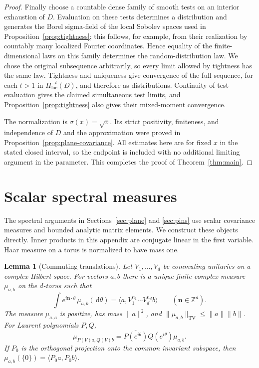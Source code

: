 \documentclass[11pt]{article}
\newtheorem{lemma}[theorem]{Lemma}
\theoremstyle{definition}
\theoremstyle{remark}
\numberwithin{equation}{section}
\begin{document}
\begin{proof}
Finally choose a countable dense family of smooth tests on an
interior exhaustion of \(D\).  Evaluation on these tests determines
a distribution and generates the Borel sigma-field of the local
Sobolev spaces used in Proposition~\ref{prop:tightness}; this follows,
for example, from their realization by countably many localized
Fourier coordinates.  Hence equality of the finite-dimensional
laws on this family determines the random-distribution law.
We chose the original subsequence arbitrarily, so every limit
allowed by tightness has the same law.  Tightness and uniqueness
give convergence of the full sequence, for each \(t>1\) in
\(H^{-t}_{\mathrm{loc}}(D)\), and therefore as distributions.
Continuity of test evaluation gives the claimed simultaneous
test limits, and Proposition~\ref{prop:tightness} also gives their
mixed-moment convergence.

The normalization is \(\sigma(x)=\sqrt v\).
Its strict positivity, finiteness, and independence of \(D\) and
the approximation were proved in
Proposition~\ref{prop:plane-covariance}.  All estimates here are
for fixed \(x\) in the stated closed interval, so the endpoint is
included with no additional limiting argument in the parameter.
This completes the proof of Theorem~\ref{thm:main}.
\end{proof}


\appendix
\section{Scalar spectral measures}\label{sec:scalar-spectra}

The spectral arguments in Sections~\ref{sec:plane} and \ref{sec:pins}
use scalar covariance measures and bounded analytic matrix elements.
We construct these objects directly.  Inner products in this appendix
are conjugate linear in the first variable.  Haar measure on a torus
is normalized to have mass one.

\begin{lemma}[Commuting translations]\label{spectra:unitary}
Let $V_1,\ldots,V_d$ be commuting unitaries on a complex Hilbert space.
For vectors $a,b$ there is a unique finite complex measure $\mu_{a,b}$
on the $d$-torus such that
\[
 \int e^{i\mathbf n\cdot\theta}\,\mu_{a,b}(\,\mathrm d\theta)
   =\langle a,V_1^{n_1}\cdots V_d^{n_d}b\rangle
 \qquad(\mathbf n\in\mathbb Z^d).
\]
The measure $\mu_{a,a}$ is positive, has mass $\|a\|^2$, and
$\|\mu_{a,b}\|_{\mathrm{TV}}\le\|a\|\|b\|$.  For Laurent polynomials $P,Q$,
\[
 \mu_{P(V)a,Q(V)b}
   =\overline{P(e^{i\theta})}Q(e^{i\theta})\mu_{a,b}.
\]
If $P_0$ is the orthogonal projection onto the common invariant
subspace, then $\mu_{a,b}(\{0\})=\langle P_0a,P_0b\rangle$.
\end{lemma}
\end{document}
